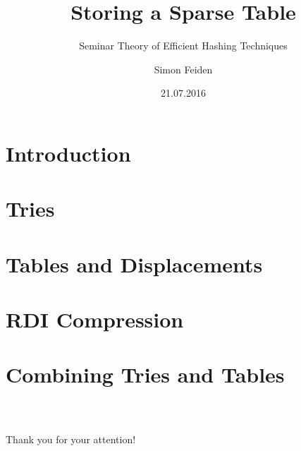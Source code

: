 \documentclass{beamer}
\title{Storing a Sparse Table}
\subtitle{Seminar Theory of Efficient Hashing Techniques}
\date{21.07.2016}
\author{Simon Feiden}
\begin{document}
	
	
\maketitle

\begin{frame}
	\tableofcontents
\end{frame}


\section{Introduction}



\section{Tries}



\section{Tables and Displacements}




\section{RDI Compression}



\section{Combining Tries and Tables}



\begin{frame}
	\frametitle{\ }
	\begin{center}
		\LARGE Thank you for your attention!
	\end{center}
\end{frame}


\begin{frame}
\end{frame}







\end{document}
